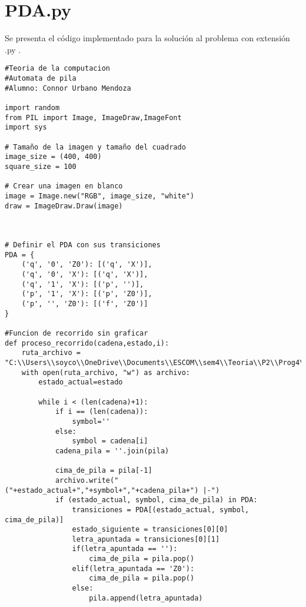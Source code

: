 \section{PDA.py}
Se presenta el código implementado para la solución al problema con extensión .py . \newline
\\
\begin{lstlisting}
#Teoria de la computacion
#Automata de pila
#Alumno: Connor Urbano Mendoza

import random
from PIL import Image, ImageDraw,ImageFont
import sys

# Tamaño de la imagen y tamaño del cuadrado
image_size = (400, 400)
square_size = 100

# Crear una imagen en blanco
image = Image.new("RGB", image_size, "white")
draw = ImageDraw.Draw(image)



# Definir el PDA con sus transiciones
PDA = {
    ('q', '0', 'Z0'): [('q', 'X')],
    ('q', '0', 'X'): [('q', 'X')],
    ('q', '1', 'X'): [('p', '')],
    ('p', '1', 'X'): [('p', 'Z0')],
    ('p', '', 'Z0'): [('f', 'Z0')]
}

#Funcion de recorrido sin graficar
def proceso_recorrido(cadena,estado,i):
    ruta_archivo = "C:\\Users\\soyco\\OneDrive\\Documents\\ESCOM\\sem4\\Teoria\\P2\\Prog4\\output\\trancisiones.txt"
    with open(ruta_archivo, "w") as archivo:
        estado_actual=estado
        
        while i < (len(cadena)+1):
            if i == (len(cadena)):
                symbol=''
            else:
                symbol = cadena[i]
            cadena_pila = ''.join(pila)

            cima_de_pila = pila[-1]
            archivo.write("("+estado_actual+","+symbol+","+cadena_pila+") |-")
            if (estado_actual, symbol, cima_de_pila) in PDA:
                transiciones = PDA[(estado_actual, symbol, cima_de_pila)]
                estado_siguiente = transiciones[0][0]  
                letra_apuntada = transiciones[0][1]
                if(letra_apuntada == ''):
                    cima_de_pila = pila.pop()
                elif(letra_apuntada == 'Z0'):
                    cima_de_pila = pila.pop()
                else:
                    pila.append(letra_apuntada)
                    

\end{lstlisting}
